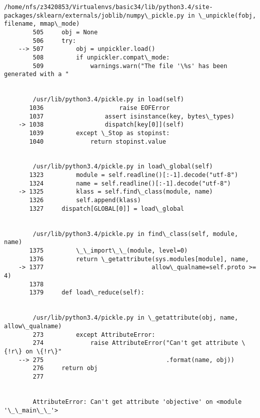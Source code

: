 \documentclass[11pt]{article}
\begin{document}
\begin{Verbatim}[commandchars=\\\{\}]
        /home/nfs/z3420853/Virtualenvs/basic34/lib/python3.4/site-packages/sklearn/externals/joblib/numpy\_pickle.py in \_unpickle(fobj, filename, mmap\_mode)
        505     obj = None
        506     try:
    --> 507         obj = unpickler.load()
        508         if unpickler.compat\_mode:
        509             warnings.warn("The file '\%s' has been generated with a "


        /usr/lib/python3.4/pickle.py in load(self)
       1036                     raise EOFError
       1037                 assert isinstance(key, bytes\_types)
    -> 1038                 dispatch[key[0]](self)
       1039         except \_Stop as stopinst:
       1040             return stopinst.value


        /usr/lib/python3.4/pickle.py in load\_global(self)
       1323         module = self.readline()[:-1].decode("utf-8")
       1324         name = self.readline()[:-1].decode("utf-8")
    -> 1325         klass = self.find\_class(module, name)
       1326         self.append(klass)
       1327     dispatch[GLOBAL[0]] = load\_global


        /usr/lib/python3.4/pickle.py in find\_class(self, module, name)
       1375         \_\_import\_\_(module, level=0)
       1376         return \_getattribute(sys.modules[module], name,
    -> 1377                              allow\_qualname=self.proto >= 4)
       1378 
       1379     def load\_reduce(self):


        /usr/lib/python3.4/pickle.py in \_getattribute(obj, name, allow\_qualname)
        273         except AttributeError:
        274             raise AttributeError("Can't get attribute \{!r\} on \{!r\}"
    --> 275                                  .format(name, obj))
        276     return obj
        277 


        AttributeError: Can't get attribute 'objective' on <module '\_\_main\_\_'>

    \end{Verbatim}



    
    




    
    
\end{document}
